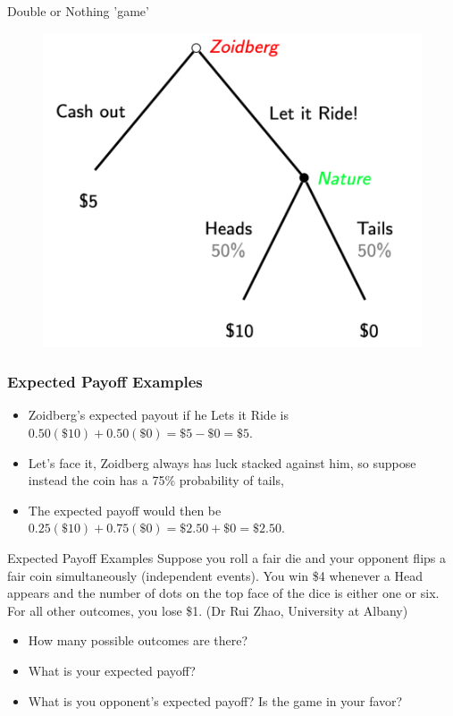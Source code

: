 
\begin{frame}{Double or Nothing 'game'}
  \begin{figure}
    \includegraphics[width = .8\textwidth]{figures/doubleornothing.png}
  \end{figure}
\end{frame}


\begin{frame}
\frametitle{Expected Payoff Examples}
\begin{itemize}

  \item Zoidberg's expected payout if he Lets it Ride is 
	$0.50(\$10) + 0.50(\$0) = \$5 - \$0 = \$5$.

  \bigskip
	\item Let's face it, Zoidberg always has luck stacked against him, so suppose instead the coin has a 75\% probability of tails,
  \item The expected payoff would then be $0.25(\$10) + 0.75(\$0) = \$2.50 + \$0 = \$2.50 $.
\end{itemize}
\end{frame}


\begin{frame}{Expected Payoff Examples}
  Suppose you roll a fair die and your opponent flips a fair coin simultaneously (independent events).
  You win \$4 whenever a Head appears and the number of dots on the top face of the dice is either one or six. 
  For all other outcomes, you lose \$1. (Dr Rui Zhao, University at Albany)
  \begin{itemize}
    \item How many possible outcomes are there?
    \vspace{5mm}
    \item What is your expected payoff?
    \vspace{5mm}
    \item What is you opponent's expected payoff? 
    Is the game in your favor?
  \end{itemize}
\end{frame}
 
